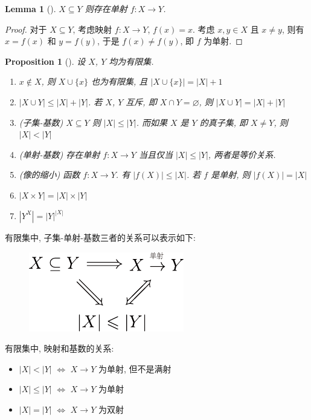 \documentclass[UTF8]{ctexart}
\theoremstyle{mystyle}
\newtheorem{lemma}{Lemma}[section]
\newtheorem{proposition}{Proposition}[section]
\theoremstyle{myremark}
\theoremstyle{plain}
\newcommand{\set}[1]{\{#1\}}
\begin{document}
\begin{lemma}[] \label{subset-injection}
    $ X \subseteq Y $ 则存在单射 $ f \colon X \to Y $.
\end{lemma}

\begin{proof}
    对于 $ X \subseteq Y $, 考虑映射 $ f\colon X \to Y $, $ f(x) = x $. 考虑 $ x, y \in X $ 且 $ x \neq y $, 则有 $ x = f(x) $ 和 $ y = f(y) $, 于是 $ f(x) \neq f(y) $, 即 $ f $ 为单射.
\end{proof}

\begin{proposition}[] \label{cardinal II}
    设 $ X $, $ Y $ 均为有限集.
    \begin{enumerate}
        \item $ x \notin X $, 则 $ X \cup \set{x} $ 也为有限集, 且 $ |X \cup \set{x}| = |X| + 1 $
        \item $ |X \cup Y| \leqslant |X| + |Y| $. 若 $ X $, $ Y $ 互斥, 即 $ X \cap Y = \varnothing $, 则 $ |X \cup Y| = |X| + |Y| $
        \item (子集-基数) $ X \subseteq Y $ 则 $ |X| \leqslant |Y| $. 而如果 $ X $ 是 $ Y $ 的真子集, 即 $ X \neq Y $, 则 $ |X| < |Y| $
        \item (单射-基数) 存在单射 $ f\colon X \to Y $ 当且仅当 $ |X| \leqslant |Y| $, 两者是等价关系.
        \item (像的缩小) 函数 $ f \colon X \to Y $. 有 $ |f(X)| \leqslant |X| $. 若 $ f $ 是单射, 则 $ |f(X)| = |X| $
        \item $ |X \times Y| = |X| \times |Y| $
        \item $ |Y^X| = |Y|^{|X|} $
    \end{enumerate}
\end{proposition}

有限集中, 子集-单射-基数三者的关系可以表示如下:
\begin{figure}[H]
    \centering
    \includegraphics[width = 0.35\linewidth]{./images/implies.pdf}
\end{figure}

有限集中, 映射和基数的关系:
\begin{itemize}
    \item $ |X| < |Y| $ $ \Longleftrightarrow $ $ X \to Y $ 为单射, 但不是满射
    \item $ |X| \leqslant |Y| $ $ \Longleftrightarrow $ $ X \to Y $ 为单射
    \item $ |X| = |Y| $ $ \Longleftrightarrow $ $ X \to Y $ 为双射
\end{itemize}
\end{document}

